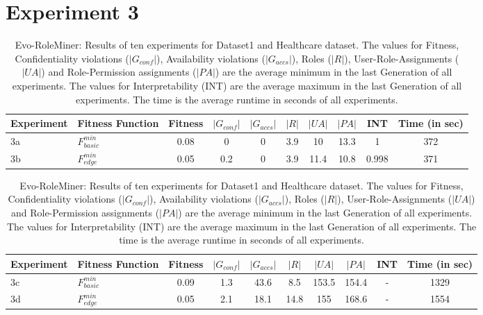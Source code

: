 \section{Experiment 3}
\label{sec:A_Exp3}
	\begin{table}
		\centering
		\caption{Evo-RoleMiner: Results of ten experiments for Dataset1 and Healthcare dataset. The values for Fitness, Confidentiality violations ($|G_{conf}|$), Availability violations ($|G_{accs}|$), Roles ($|R|$), User-Role-Assignments ($|UA|$) and Role-Permission assignments ($|PA|$) are the average minimum in the last Generation of all experiments. The values for Interpretability (INT) are the average maximum in the last Generation of all experiments. The time is the average runtime in seconds of all experiments.}
		\label{tab:exp3_results}
		\begin{adjustbox}{width=\textwidth}
			\begin{tabular}{|l|l|c|c|c|c|c|c|c|c|}
				\hline
				\rowcolor{myGray} 
				\textbf{Experiment} & \textbf{Fitness Function} & \textbf{Fitness} & \textbf{$|G_{conf}|$} & \textbf{$|G_{accs}|$} & \textbf{$|R|$} & \textbf{$|UA|$} & \textbf{$|PA|$} & \textbf{INT} & \textbf{Time (in sec)}\\ \hline
				3a & $F_{basic}^{min}$ &   0.08   &   0   &   0   &   3.9   &   10   &   13.3   &   1   & 372\\ \hline
				3b & $F_{edge}^{min}$ &   0.05   &   0.2   &   0   &   3.9   &   11.4   &   10.8   &   0.998   & 371\\ \hline  
			\end{tabular}
		\end{adjustbox}
		\bigskip
		\begin{adjustbox}{width=\textwidth}
			\begin{tabular}{|l|l|c|c|c|c|c|c|c|c|}
				\hline
				\rowcolor{myGray} 
				\textbf{Experiment} & \textbf{Fitness Function} & \textbf{Fitness} & \textbf{$|G_{conf}|$} & \textbf{$|G_{accs}|$} & \textbf{$|R|$} & \textbf{$|UA|$} & \textbf{$|PA|$} & \textbf{INT} & \textbf{Time (in sec)}\\ \hline
				3c & $F_{basic}^{min}$ &   0.09   &   1.3   &   43.6   &   8.5   &   153.5   &   154.4   &   -   & 1329\\ \hline
				3d & $F_{edge}^{min}$  &   0.05   &   2.1   &   18.1   &   14.8   &   155   &   168.6   &   -   & 1554\\ \hline
			\end{tabular}
		\end{adjustbox}
	\end{table}
